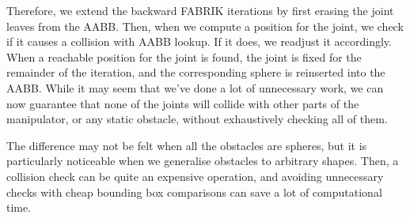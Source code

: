 Therefore, we extend the backward FABRIK iterations by first erasing the joint leaves from the AABB. Then, when we compute a position for the joint, we check if it causes a collision with AABB lookup. If it does, we readjust it accordingly. When a reachable position for the joint is found, the joint is fixed for the remainder of the iteration, and the corresponding sphere is reinserted into the AABB. While it may seem that we've done a lot of unnecessary work, we can now guarantee that none of the joints will collide with other parts of the manipulator, or any static obstacle, without exhaustively checking all of them.

The difference may not be felt when all the obstacles are spheres, but it is particularly noticeable when we generalise obstacles to arbitrary shapes. Then, a collision check can be quite an expensive operation, and avoiding unnecessary checks with cheap bounding box comparisons can save a lot of computational time.
